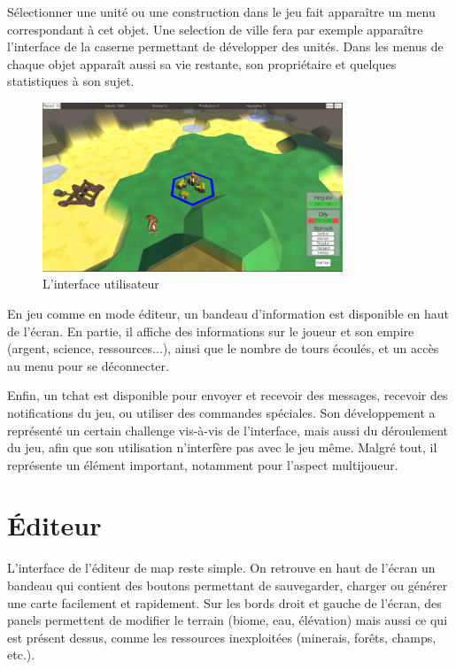 \documentclass[12pt]{report}
\begin{document}
Sélectionner une unité ou une construction dans le jeu fait apparaître un menu
correspondant à cet objet. Une selection de ville fera par exemple apparaître
l’interface de la caserne permettant de développer des unités. Dans les menus de
chaque objet apparaît aussi sa vie restante, son propriétaire et quelques
statistiques à son sujet.

\begin{figure}[H]
    \centering
    \includegraphics[width=0.8\textwidth]{game_ui}
    \caption*{L'interface utilisateur}
\end{figure}

En jeu comme en mode éditeur, un bandeau d’information est disponible en haut de
l’écran. En partie, il affiche des informations sur le joueur et son empire
(argent, science, ressources...), ainsi que le nombre de tours écoulés, et un
accès au menu pour se déconnecter.

Enfin, un tchat est disponible pour envoyer et recevoir des messages, recevoir
des notifications du jeu, ou utiliser des commandes spéciales. Son développement
a représenté un certain challenge vis-à-vis de l’interface, mais aussi du
déroulement du jeu, afin que son utilisation n’interfère pas avec le jeu même.
Malgré tout, il représente un élément important, notamment pour l’aspect
multijoueur.

\section{Éditeur}

L’interface de l’éditeur de map reste simple. On retrouve en haut de l’écran un
bandeau qui contient des boutons permettant de sauvegarder, charger ou générer
une carte facilement et rapidement. Sur les bords droit et gauche de l’écran,
des panels permettent de modifier le terrain (biome, eau, élévation) mais aussi
ce qui est présent dessus, comme les ressources inexploitées (minerais, forêts,
champs, etc.).
\end{document}
